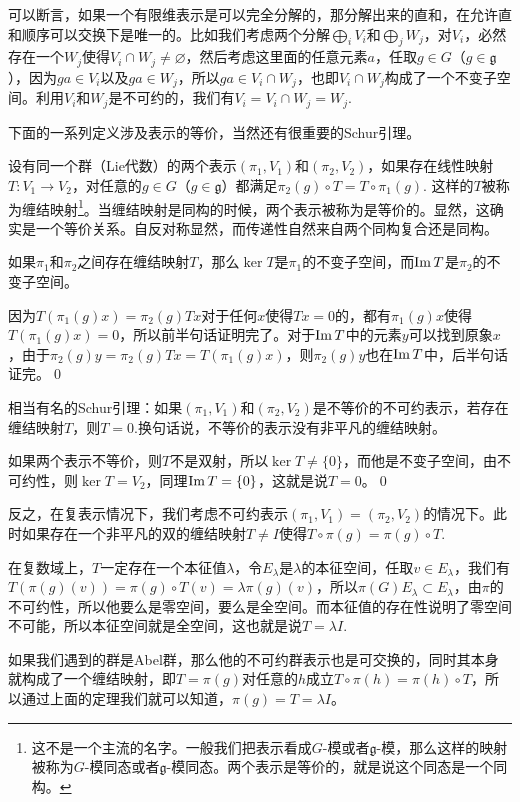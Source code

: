 \documentclass[9pt]{extarticle}
\newcommand{\lag}{{\mathfrak{g}}}
\begin{document}
\para 可以断言，如果一个有限维表示是可以完全分解的，那分解出来的直和，在允许直和顺序可以交换下是唯一的。比如我们考虑两个分解$\bigoplus_i V_i$和$\bigoplus_j W_j$，对$V_i$，必然存在一个$W_j$使得$V_i\cap W_j\neq \varnothing$，然后考虑这里面的任意元素$a$，任取$g\in G$（$g\in\lag$），因为$ga\in V_i$以及$ga\in W_j$，所以$ga\in V_i\cap W_j$，也即$V_i\cap W_j$构成了一个不变子空间。利用$V_i$和$W_j$是不可约的，我们有$V_i=V_i\cap W_j=W_j$.

下面的一系列定义涉及表示的等价，当然还有很重要的Schur引理。

\para 设有同一个群（Lie代数）的两个表示$(\pi_1,V_1)$和$(\pi_2,V_2)$，如果存在线性映射$T:V_1\to V_2$，对任意的$g\in G$（$g\in \lag$）都满足$\pi_2(g)\circ T=T\circ \pi_1(g)$. 这样的$T$被称为缠结映射\footnote{这不是一个主流的名字。一般我们把表示看成$G$-模或者$\lag$-模，那么这样的映射被称为$G$-模同态或者$\lag$-模同态。两个表示是等价的，就是说这个同态是一个同构。}。当缠结映射是同构的时候，两个表示被称为是等价的。显然，这确实是一个等价关系。自反对称显然，而传递性自然来自两个同构复合还是同构。

\lem 如果$\pi_1$和$\pi_2$之间存在缠结映射$T$，那么$\ker T$是$\pi_1$的不变子空间，而$\operatorname{Im} T$是$\pi_2$的不变子空间。

\proof 因为$T(\pi_1(g)x)=\pi_2(g)Tx$对于任何$x$使得$Tx=0$的，都有$\pi_1(g)x$使得$T(\pi_1(g)x)=0$，所以前半句话证明完了。对于$\operatorname{Im} T$中的元素$y$可以找到原象$x$，由于$\pi_2(g)y=\pi_2(g)Tx=T(\pi_1(g)x)$，则$\pi_2(g)y$也在$\operatorname{Im} T$中，后半句话证完。\qed

\lem 相当有名的Schur引理：如果$(\pi_1,V_1)$和$(\pi_2,V_2)$是不等价的不可约表示，若存在缠结映射$T$，则$T=0$.换句话说，不等价的表示没有非平凡的缠结映射。

\proof 如果两个表示不等价，则$T$不是双射，所以$\ker T\neq \{0\}$，而他是不变子空间，由不可约性，则$\ker T= V_2$，同理$\operatorname{Im}  T= \{0\}$，这就是说$T=0$。\qed

\para 反之，在复表示情况下，我们考虑不可约表示$(\pi_1,V_1)=(\pi_2,V_2)$的情况下。此时如果存在一个非平凡的双的缠结映射$T\neq I$使得$T\circ \pi(g)=\pi(g)\circ T$.

在复数域上，$T$一定存在一个本征值$\lambda$，令$E_\lambda$是$\lambda$的本征空间，任取$v\in E_\lambda$，我们有$T(\pi(g)(v))=\pi(g)\circ T(v)=\lambda\pi(g)(v)$，所以$\pi(G)E_\lambda\subset E_\lambda$，由$\pi$的不可约性，所以他要么是零空间，要么是全空间。而本征值的存在性说明了零空间不可能，所以本征空间就是全空间，这也就是说$T=\lambda I$.

\para 如果我们遇到的群是Abel群，那么他的不可约群表示也是可交换的，同时其本身就构成了一个缠结映射，即$T=\pi(g)$对任意的$h$成立$T\circ \pi(h)=\pi(h)\circ T$，所以通过上面的定理我们就可以知道，$\pi(g)=T=\lambda I$。
\end{document}
